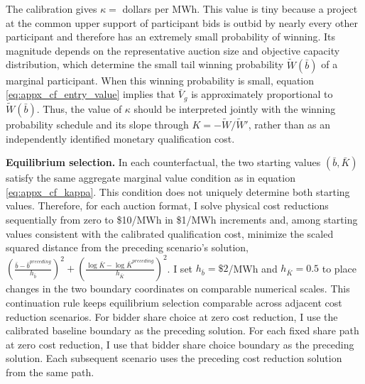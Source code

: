 \documentclass[12pt]{article}
\theoremstyle{definition} %
\begin{document}
The calibration gives $\kappa=$ dollars per MWh. This value is tiny because a project at the common upper support of participant bids is outbid by nearly every other participant and therefore has an extremely small probability of winning. Its magnitude depends on the representative auction size and objective capacity distribution, which determine the small tail winning probability \(\widetilde W(\bar b)\) of a marginal participant. When this winning probability is small, equation \eqref{eq:appx_cf_entry_value} implies that $\bar V_g$ is approximately proportional to $\widetilde W(\bar b)$. Thus, the value of $\kappa$ should be interpreted jointly with the winning probability schedule and its slope through $K=-\widetilde W/\widetilde W'$, rather than as an independently identified monetary qualification cost.

\textbf{Equilibrium selection.} In each counterfactual, the two starting values $(\bar b,\bar K)$ satisfy the same aggregate marginal value condition as in equation \eqref{eq:appx_cf_kappa}. This condition does not uniquely determine both starting values. Therefore, for each auction format, I solve physical cost reductions sequentially from zero to \$10/MWh in \$1/MWh increments and, among starting values consistent with the calibrated qualification cost, minimize the scaled squared distance from the preceding scenario's solution, $\left(\frac{\bar b-\bar b^{preceding}}{h_{\bar b}}\right)^2+\left(\frac{\log\bar K-\log\bar K^{preceding}}{h_{\bar K}}\right)^2$. I set $h_{\bar b}=\$2$/MWh and $h_{\bar K}=0.5$ to place changes in the two boundary coordinates on comparable numerical scales. This continuation rule keeps equilibrium selection comparable across adjacent cost reduction scenarios. For bidder share choice at zero cost reduction, I use the calibrated baseline boundary as the preceding solution. For each fixed share path at zero cost reduction, I use that bidder share choice boundary as the preceding solution. Each subsequent scenario uses the preceding cost reduction solution from the same path.
\end{document}
